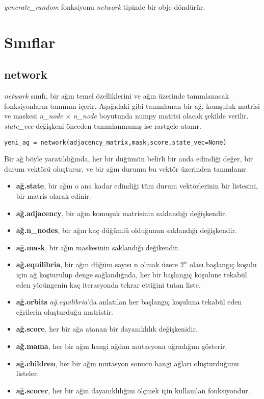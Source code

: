 \emph{generate\_random} fonksiyonu \emph{network} tipinde bir obje döndürür. 

\section{Sınıflar}
\subsection{network}

\emph{network} sınıfı, bir ağın temel özelliklerini ve ağın üzerinde tanımlanacak fonksiyonların tanımını içerir. Aşağıdaki gibi tanımlanan bir ağ, komşuluk matrisi ve maskesi \emph{n\_node} $\times$ \emph{n\_node} boyutunda numpy matrisi olacak şekilde verilir. \emph{state\_vec} değişkeni önceden tanımlanmamış ise rastgele atanır.

\label{code_network}
\begin{lstlisting}
yeni_ag = network(adjacency_matrix,mask,score,state_vec=None)
\end{lstlisting}

Bir ağ böyle yaratıldığında, her bir düğümün belirli bir anda edindiği değer, bir durum vektörü oluşturur, ve bir ağın durumu bu vektör üzerinden tanımlanır.
\begin{itemize}
\item \textbf{ağ.state}, bir ağın o ana kadar edindiği tüm durum vektörlerinin bir listesini, bir matris olarak edinir.
\item \textbf{ağ.adjacency}, bir ağın komuşuk matrisinin saklandığı değişkendir.
\item \textbf{ağ.n\_nodes}, bir ağın kaç düğümlü olduğunun saklandığı değişkendir. 
\item \textbf{ağ.mask}, bir ağın maskesinin saklandığı değikendir. 
\item \textbf{ağ.equilibria}, bir ağın düğüm sayısı n olmak üzere $2^n$ olası başlangıç koşulu için ağ koşturulup denge sağlandığnda, her bir başlangıç koşulune tekabül eden yörüngenin kaç iterasyonda tekrar ettiğini tutan liste.
\item \textbf{ağ.orbits} \emph{ağ.equilibria}'da anlatılan her başlangıç koşuluna tekabül eden eğrilerin oluşturduğu matristir.
\item \textbf{ağ.score}, her bir ağa atanan bir dayanıklılık değişkenidir. 
\item \textbf{ağ.mama}, her bir ağın hangi ağdan mutasyona uğradığını gösterir.
\item \textbf{ağ.children}, her bir ağın mutasyon sonucu hangi ağları oluşturduğunu listeler.
\item \textbf{ağ.scorer}, her bir ağın dayanıklılığını ölçmek için kullanılan fonksiyondur.
\end{itemize}

